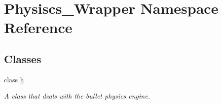 \hypertarget{namespace_physiscs___wrapper}{}\section{Physiscs\+\_\+\+Wrapper Namespace Reference}
\label{namespace_physiscs___wrapper}
\subsection*{Classes}
\begin{DoxyCompactItemize}
\item 
class \hyperlink{class_physiscs___wrapper_1_1h}{h}
\begin{DoxyCompactList}\small\item\em A class that deals with the bullet physics engine. \end{DoxyCompactList}\end{DoxyCompactItemize}
